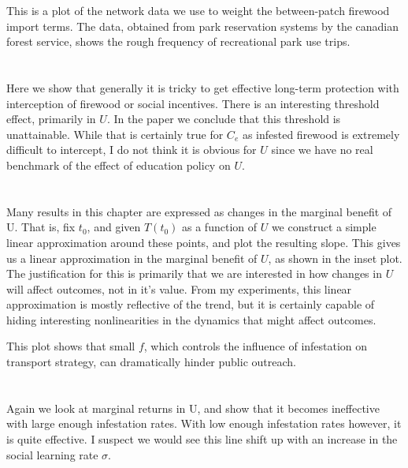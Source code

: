 \documentclass{article}
\begin{document}
This is a plot of the network data we use to weight the between-patch firewood import terms. The data, obtained from park reservation systems by the canadian forest service, shows the rough frequency of recreational park use trips.

\section{}

Here we show that generally it is tricky to get effective long-term protection with interception of firewood or social incentives. There is an interesting threshold effect, primarily in $U$. In the paper we conclude that this threshold is unattainable. While that is certainly true for $C_e$ as infested firewood is extremely difficult to intercept, I do not think it is obvious for $U$ since we have no real benchmark of the effect of education policy on $U$.



\section{}

Many results in this chapter are expressed as changes in the marginal benefit of U. That is, fix $t_0$, and given $T(t_0)$ as a function of $U$ we construct a simple linear approximation around these points, and plot the resulting slope. This gives us a linear approximation in the marginal benefit of $U$, as shown in the inset plot. The justification for this is primarily that we are interested in how changes in $U$ will affect outcomes, not in it's value. From my experiments, this linear approximation is mostly reflective of the trend, but it is certainly capable of hiding interesting nonlinearities in the dynamics that might affect outcomes.  

This plot shows that small $f$, which controls the influence of infestation on transport strategy, can dramatically hinder public outreach.

\section{}

Again we look at marginal returns in U, and show that it becomes ineffective with large enough infestation rates. With low enough infestation rates however, it is quite effective. I suspect we would see this line shift up with an increase in the social learning rate $\sigma$.
\end{document}
